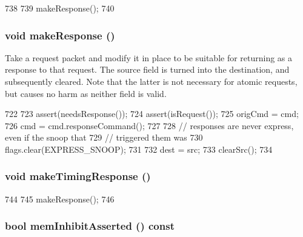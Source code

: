\begin{DoxyCode}
738     {
739         makeResponse();
740     }
\end{DoxyCode}
\hypertarget{classPacket_a9330bf4cbbc7e25bbfc9626182df27e5}{
\subsubsection[{makeResponse}]{\setlength{\rightskip}{0pt plus 5cm}void makeResponse ()}}
\label{classPacket_a9330bf4cbbc7e25bbfc9626182df27e5}
Take a request packet and modify it in place to be suitable for returning as a response to that request. The source field is turned into the destination, and subsequently cleared. Note that the latter is not necessary for atomic requests, but causes no harm as neither field is valid. 


\begin{DoxyCode}
722     {
723         assert(needsResponse());
724         assert(isRequest());
725         origCmd = cmd;
726         cmd = cmd.responseCommand();
727 
728         // responses are never express, even if the snoop that
729         // triggered them was
730         flags.clear(EXPRESS_SNOOP);
731 
732         dest = src;
733         clearSrc();
734     }
\end{DoxyCode}
\hypertarget{classPacket_a325088bded521f69342b08a548811332}{
\subsubsection[{makeTimingResponse}]{\setlength{\rightskip}{0pt plus 5cm}void makeTimingResponse ()}}
\label{classPacket_a325088bded521f69342b08a548811332}



\begin{DoxyCode}
744     {
745         makeResponse();
746     }
\end{DoxyCode}
\hypertarget{classPacket_a9693a1ffeda326646443ab2a2a92be41}{
\subsubsection[{memInhibitAsserted}]{\setlength{\rightskip}{0pt plus 5cm}bool memInhibitAsserted () const}}
\label{classPacket_a9693a1ffeda326646443ab2a2a92be41}



